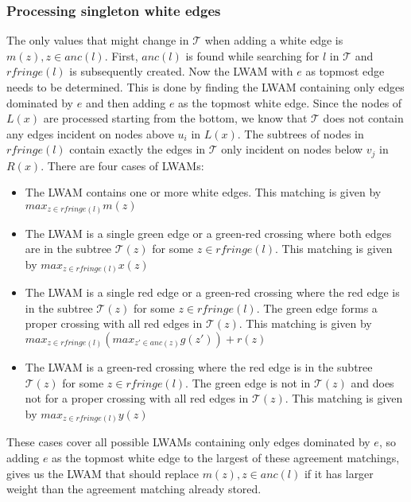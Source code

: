 \subsubsection{Processing singleton white edges}
The only values that might change in $\mathcal{T}$ when adding a white edge is $m(z), z \in anc(l)$. First, $anc(l)$ is found while searching for $l$ in $\mathcal{T}$ and $rfringe(l)$ is subsequently created. Now the LWAM with $e$ as topmost edge needs to be determined. This is done by finding the LWAM containing only edges dominated by $e$ and then adding $e$ as the topmost white edge. Since the nodes of $L(x)$ are processed starting from the bottom, we know that $\mathcal{T}$ does not contain any edges incident on nodes above $u_i$ in $L(x)$. The subtrees of nodes in $rfringe(l)$ contain exactly the edges in $\mathcal{T}$ only incident on nodes below $v_j$ in $R(x)$. %
There are four cases of LWAMs:
\begin{itemize}
	\item The LWAM contains one or more white edges.
	\subitem This matching is given by $max_{z \in rfringe(l)} m(z)$
	\item The LWAM is a single green edge or a green-red crossing where both edges are in the subtree $\mathcal{T}(z)$ for some $z \in rfringe(l)$.
	\subitem This matching is given by $max_{z \in rfringe(l)} x(z)$
	\item The LWAM is a single red edge or a green-red crossing where the red edge is in the subtree $\mathcal{T}(z)$ for some $z \in rfringe(l)$. The green edge forms a proper crossing with all red edges in $\mathcal{T}(z)$.
	\subitem This matching is given by $max_{z \in rfringe(l)} (max_{z' \in anc(z)} g(z')) + r(z)$
	\item The LWAM is a green-red crossing where the red edge is in the subtree $\mathcal{T}(z)$ for some $z \in rfringe(l)$. The green edge is not in $\mathcal{T}(z)$ and does not for a proper crossing with all red edges in $\mathcal{T}(z)$.
	This matching is given by $max_{z \in rfringe(l)} y(z)$
\end{itemize}

These cases cover all possible LWAMs containing only edges dominated by $e$, so adding $e$ as the topmost white edge to the largest of these agreement matchings, gives us the LWAM that should replace $m(z), z \in anc(l)$ if it has larger weight than the agreement matching already stored.

